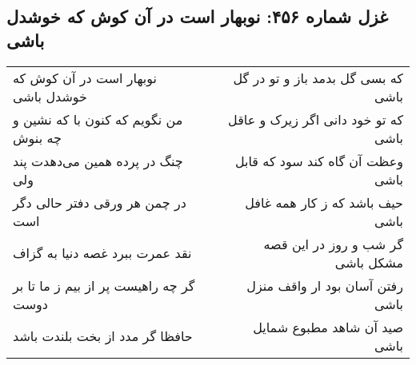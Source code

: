 \begin{center}
\section*{غزل شماره ۴۵۶: نوبهار است در آن کوش که خوشدل باشی}
\label{sec:sh456}
\begin{longtable}{l p{0.5cm} r}
نوبهار است در آن کوش که خوشدل باشی
&&
که بسی گل بدمد باز و تو در گل باشی
\\
من نگویم که کنون با که نشین و چه بنوش
&&
که تو خود دانی اگر زیرک و عاقل باشی
\\
چنگ در پرده همین می‌دهدت پند ولی
&&
وعظت آن گاه کند سود که قابل باشی
\\
در چمن هر ورقی دفتر حالی دگر است
&&
حیف باشد که ز کار همه غافل باشی
\\
نقد عمرت ببرد غصه دنیا به گزاف
&&
گر شب و روز در این قصه مشکل باشی
\\
گر چه راهیست پر از بیم ز ما تا بر دوست
&&
رفتن آسان بود ار واقف منزل باشی
\\
حافظا گر مدد از بخت بلندت باشد
&&
صید آن شاهد مطبوع شمایل باشی
\\
\end{longtable}
\end{center}
